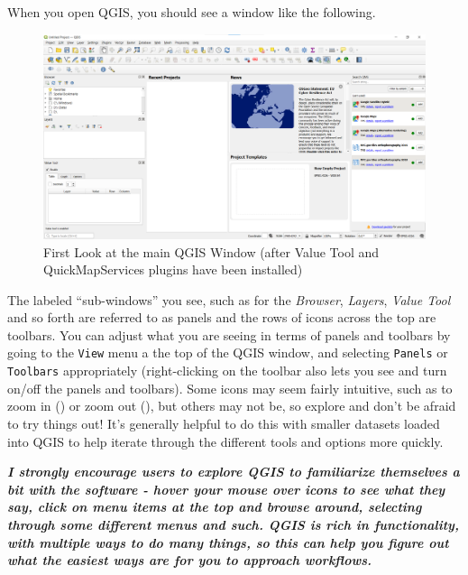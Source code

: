 \documentclass[
  letterpaper,
  DIV=11,
  numbers=noendperiod]{scrreprt}
\begin{document}
When you open QGIS, you should see a window like the following.

\begin{figure}

{\centering \includegraphics{./images/MainQGISWindow_PluginsInstalled.png}

}

\caption{First Look at the main QGIS Window (after Value Tool and
QuickMapServices plugins have been installed)}

\end{figure}

The labeled ``sub-windows'' you see, such as for the \emph{Browser},
\emph{Layers}, \emph{Value Tool} and so forth are referred to as panels
and the rows of icons across the top are toolbars. You can adjust what
you are seeing in terms of panels and toolbars by going to the
\texttt{View} menu a the top of the QGIS window, and selecting
\texttt{Panels} or \texttt{Toolbars} appropriately (right-clicking on
the toolbar also lets you see and turn on/off the panels and toolbars).
Some icons may seem fairly intuitive, such as to zoom in
() or zoom out
(), but others may
not be, so explore and don't be afraid to try things out! It's generally
helpful to do this with smaller datasets loaded into QGIS to help
iterate through the different tools and options more quickly.

\textbf{\emph{I strongly encourage users to explore QGIS to familiarize
themselves a bit with the software - hover your mouse over icons to see
what they say, click on menu items at the top and browse around,
selecting through some different menus and such. QGIS is rich in
functionality, with multiple ways to do many things, so this can help
you figure out what the easiest ways are for you to approach
workflows.}}
\end{document}
